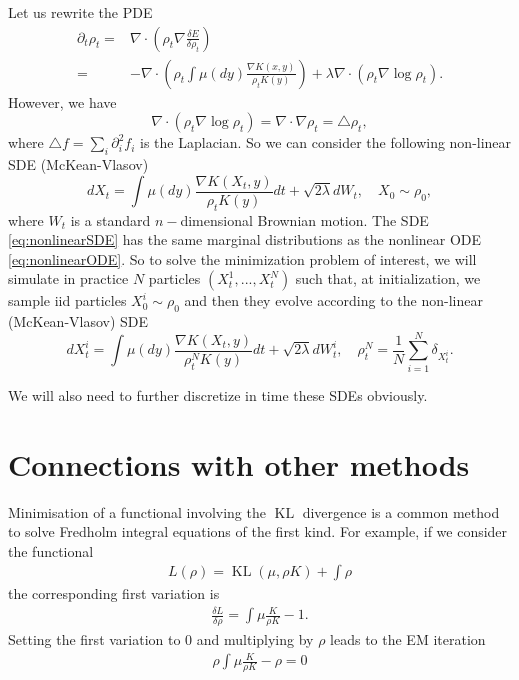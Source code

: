 \documentclass[a4paper]{article}
\DeclareMathOperator{\KL}{KL}
\begin{document}
Let us rewrite the PDE 
\begin{align*}
\partial_{t}\rho_{t}= & \nabla\cdot\left(\rho_{t}\nabla\frac{\delta E}{\delta\rho_{t}}\right)\\
= & -\nabla\cdot\left(\rho_{t}\int\mu\left(dy\right)\frac{\nabla K(x,y)}{\rho_{t}K(y)}\right)+\lambda\nabla\cdot\left(\rho_{t}\nabla\log\rho_{t}\right).
\end{align*}
However, we have
\[
\nabla\cdot\left(\rho_{t}\nabla\log\rho_{t}\right)=\nabla\cdot\nabla\rho_{t}=\triangle\rho_{t},
\]
where $\triangle f=\sum_{i}\partial_{i}^{2}f_{i}$ is the Laplacian.
So we can consider the following non-linear SDE (McKean-Vlasov) 
\begin{equation}
dX_{t}=\int\mu\left(dy\right)\frac{\nabla K(X_{t},y)}{\rho_{t}K(y)}dt+\sqrt{2\lambda}dW_{t},\quad X_{0}\sim\rho_{0},\label{eq:nonlinearSDE}
\end{equation}
where $W_{t}$ is a standard $n-$dimensional Brownian motion.
The SDE \eqref{eq:nonlinearSDE} has the same marginal distributions as the nonlinear ODE \eqref{eq:nonlinearODE}.
So to solve the minimization problem of interest, we will simulate in practice $N$ particles $(X_{t}^{1},...,X_{t}^{N})$ such that, at initialization, we sample iid particles $X_{0}^{i}\sim\rho_{0}$ and then they evolve according to the non-linear (McKean-Vlasov) SDE
\[
dX_{t}^{i}=\int\mu\left(dy\right)\frac{\nabla K(X_{t},y)}{\rho_{t}^{N}K(y)}dt+\sqrt{2\lambda}dW_{t}^{i},\quad\rho_{t}^{N}=\frac{1}{N}\sum_{i=1}^{N}\delta_{X_{t}^{i}}.
\]

We will also need to further discretize in time these SDEs obviously.

\section{Connections with other methods}
Minimisation of a functional involving the $\KL$ divergence is a common method to solve Fredholm integral equations of the first kind.
For example, if we consider the functional
\begin{align*}
L(\rho) = \KL(\mu, \rho K) + \int \rho
\end{align*}
the corresponding first variation is
\begin{align*}
\frac{\delta L}{\delta \rho}= \int \mu\frac{K}{\rho K} - 1.
\end{align*}
Setting the first variation to 0 and multiplying by $\rho$ leads to the EM iteration
\begin{align*}
\rho\int \mu\frac{K}{\rho K} - \rho = 0
\end{align*}
\end{document}
